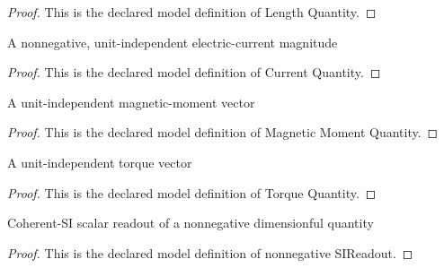 \begin{proof}
  This is the declared model definition of Length Quantity.
\end{proof}
\begin{definition}
  \label{def:physics:phyx-mini-0609:phyxminiproblems-problemphyxmini0609-currentquantity}
  A nonnegative, unit-independent electric-current magnitude
\end{definition}
\begin{proof}
  This is the declared model definition of Current Quantity.
\end{proof}
\begin{definition}
  \label{def:physics:phyx-mini-0609:phyxminiproblems-problemphyxmini0609-magneticmomentquantity}
  A unit-independent magnetic-moment vector
\end{definition}
\begin{proof}
  This is the declared model definition of Magnetic Moment Quantity.
\end{proof}
\begin{definition}
  \label{def:physics:phyx-mini-0609:phyxminiproblems-problemphyxmini0609-torquequantity}
  A unit-independent torque vector
\end{definition}
\begin{proof}
  This is the declared model definition of Torque Quantity.
\end{proof}
\begin{definition}
  \label{def:physics:phyx-mini-0609:phyxminiproblems-problemphyxmini0609-nonnegativesireadout}
  Coherent-SI scalar readout of a nonnegative dimensionful quantity
\end{definition}
\begin{proof}
  This is the declared model definition of nonnegative SIReadout.
\end{proof}
